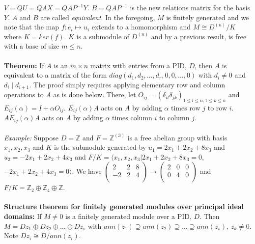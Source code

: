 $V= QU = QAX= QAP^{-1}Y$.  $B=QAP^{-1}$ is the new relations matrix for the basis $Y$.
$A$ and $B$ are called \emph{equivalent}.
In the foregoing, $M$ is finitely generated and we note that the map
$f: e_i \mapsto u_i$ extends to a homomorphism
and $M \cong D^{(n)} / K$ where $K= ker(f)$.  $K$ is
a submodule of $D^{(n)}$ and by a previous result, is free with a base of size $m \le n$.
\\
\\
{\bf Theorem:}  If $A$ is an $m \times n$ matrix with entries from a PID,
$D$, then $A$ is equivalent to a matrix of the form
$diag(d_1, d_2, \ldots, d_r, 0, 0, \ldots, 0)$ with $d_i \ne 0$ and $d_i \mid d_{i+1}$.
The proof simply requires applying elementary row and column operations to 
$A$ as is done below.
There, let $O_{ij}= (\delta_{il} \delta_{jk})_{1 \leq l \leq n, 1 \leq k \leq n}$
and $E_{ij}(\alpha)= I+ \alpha O_{ij}$.
$E_{ij} (\alpha) A$ acts on $A$ by adding $\alpha$ times row $j$ to row  $i$.
$A E_{ij} (\alpha) A$ acts on $A$ by adding $\alpha$ times column $i$ to column $j$.
\\
\\
\emph{Example:} Suppose $D= {\mathbb Z}$ and $F= {\mathbb Z}^{(3)}$ 
is a free abelian group with basis $x_1, x_2, x_3$ and
$K$ is the submodule generated by
$u_1= 2 x_1 + 2x_2 + 8 x_3$ and $u_2= -2 x_1 + 2 x_2 + 4 x_3$ and
$F/K= 
\langle x_1 , x_2, x_3  | 2 x_1 + 2x_2 + 8 x_3 = 0$, $-2 x_1 + 2 x_2 + 4 x_3 = 0 \rangle$.
We have $ \left(
\begin{array}{ccc}
2 & 2 & 8\\
-2 & 2 & 4\\
\end{array}
\right) 
\rightarrow
\left(
\begin{array}{ccc}
2 & 0 & 0\\
0 & 4 & 0\\
\end{array}
\right)$ 
and $F/K = {\mathbb Z}_2 \oplus {\mathbb Z}_4 \oplus {\mathbb Z}$.
\\
\\
{\bf Structure theorem for finitely generated modules over principal ideal domains:} 
If $M \ne 0$ is a finitely generated module over a PID, $D$. Then $M= Dz_{1} \oplus
Dz_{2} \oplus \ldots \oplus Dz_{s}$ with
$ann(z_{1}) \supseteq ann(z_{2}) \supseteq \ldots \supseteq ann(z_{s})$, 
$z_{k} \ne 0$.  Note $D z_i \cong D/ann(z_i)$.
